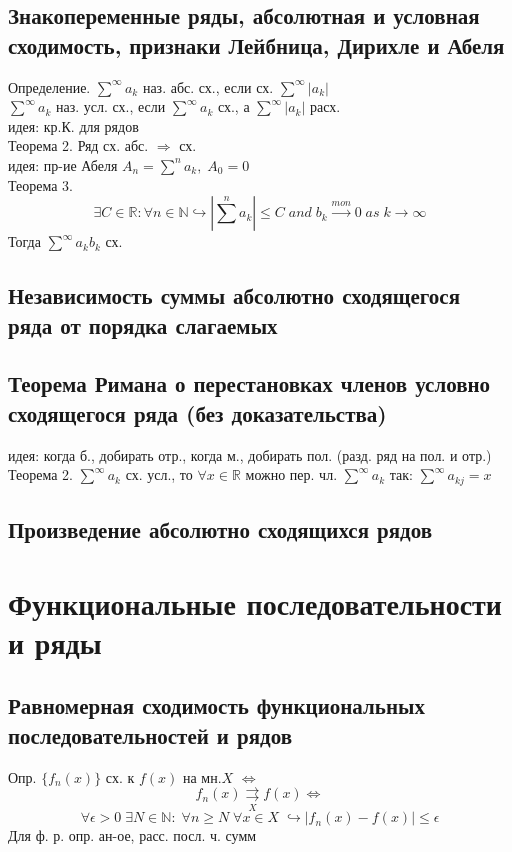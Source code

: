 \documentclass{article}
\begin{document}
\subsection{Знакопеременные ряды, абсолютная и условная сходимость, признаки Лейбница, Дирихле и Абеля}
Определение. $\overset{\infty}{\sum} a_k$ наз. абс. сх., если сх. $\overset{\infty}{\sum} |a_k|$ \\
$\overset{\infty}{\sum} a_k$ наз. усл. сх., если $\overset{\infty}{\sum} a_k$ сх., а $\overset{\infty}{\sum} |a_k|$ расх. \\
идея: кр.К. для рядов \\
Теорема 2. Ряд сх. абс. $\Rightarrow$ сх. \\
идея: пр-ие Абеля $A_n = \overset{n}{\sum} a_k, \; A_0 = 0 $ \\
Теорема 3.
\begin{equation*}
    \exists C \in \mathbb R: \forall n \in \mathbb N \hookrightarrow |\overset{n}{\sum} a_k| \leq C \; and \; b_k \overset{mon}{\rightarrow} 0 \; as \; k \rightarrow \infty
\end{equation*}
Тогда $\overset{\infty}{\sum} a_k b_k$ сх.
\subsection{Независимость суммы абсолютно сходящегося ряда от порядка слагаемых}
\subsection{Теорема Римана о перестановках
членов условно сходящегося ряда (без доказательства)}
идея: когда б., добирать отр., когда м., добирать пол. (разд. ряд на пол. и отр.) \\
Теорема 2. $\overset{\infty}{\sum} a_k$ сх. усл., то $\forall x \in \mathbb R$ можно пер. чл. $\overset{\infty}{\sum} a_k$ так: $\overset{\infty}{\sum} a_{kj} = x$
\subsection{Произведение абсолютно сходящихся рядов}


\section{Функциональные последовательности и ряды}
\subsection{Равномерная сходимость функциональных последовательностей и рядов}
Опр. $\{ f_n (x) \}$ сх. к $f(x)$ на мн.$X$ $\Leftrightarrow$
\begin{equation*}
    f_n (x) \underset{X}{\rightrightarrows} f(x) \Leftrightarrow
\end{equation*}
\begin{equation*}
    \forall \epsilon > 0 \; \exists N \in \mathbb N: \; \forall n \geq N \; \forall x \in X \; \hookrightarrow |f_n (x) - f(x)| \leq \epsilon
\end{equation*}
Для ф. р. опр. ан-ое, расс. посл. ч. сумм
\end{document}
